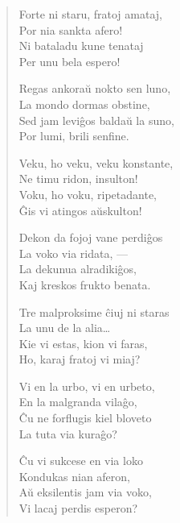 \begin{verse}
                   Forte ni staru, fratoj amataj,\\
                   Por nia sankta afero!\\
                   Ni bataladu kune tenataj\\
                   Per unu bela espero!

                    \vin    Regas ankora\u u nokto sen luno,\\
                     \vin   La mondo dormas obstine,\\
                     \vin   Sed jam levi\^gos balda\u u la suno,\\
                     \vin   Por lumi, brili senfine.

                   Veku, ho veku, veku konstante,\\
                   Ne timu ridon, insulton!\\
                   Voku, ho voku, ripetadante,\\
                   \^Gis vi atingos a\u uskulton!

                     \vin   Dekon da fojoj vane perdi\^gos\\
                    \vin    La voko via ridata, ---\\
                    \vin    La dekunua alradiki\^gos,\\
                     \vin   Kaj kreskos frukto benata.

                   Tre malproksime \^ciuj ni staras\\
                   La unu de la alia\dots\\
                   Kie vi estas, kion vi faras,\\
                   Ho, karaj fratoj vi miaj?

                    \vin    Vi en la urbo, vi en urbeto,\\
                   \vin     En la malgranda vila\^go,\\
                    \vin    \^Cu ne forflugis kiel bloveto\\
                    \vin    La tuta via kura\^go?

                   \^Cu vi sukcese en via loko\\
                   Kondukas nian aferon,\\
                   A\u u eksilentis jam via voko,\\
                   Vi lacaj perdis esperon?


\end{verse}
